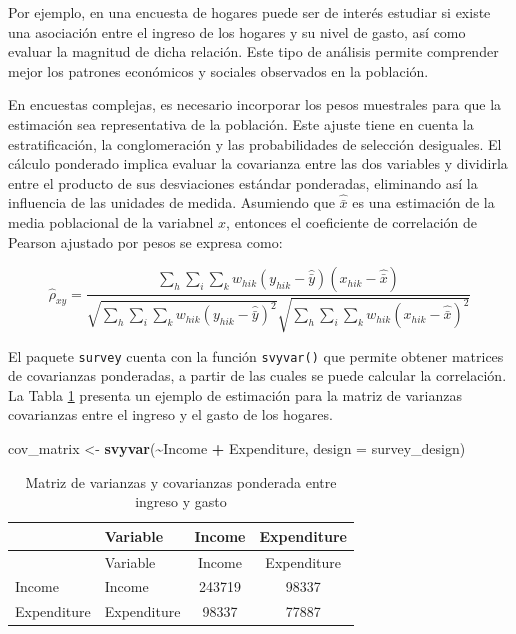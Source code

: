 \documentclass[
  spanish,
  12pt,
]{book}
\newenvironment{Shaded}{\begin{snugshade}}{\end{snugshade}}
\newcommand{\AttributeTok}[1]{\textcolor[rgb]{0.13,0.29,0.53}{#1}}
\newcommand{\FunctionTok}[1]{\textcolor[rgb]{0.13,0.29,0.53}{\textbf{#1}}}
\newcommand{\NormalTok}[1]{#1}
\newcommand{\OtherTok}[1]{\textcolor[rgb]{0.56,0.35,0.01}{#1}}
\newcommand{\SpecialCharTok}[1]{\textcolor[rgb]{0.81,0.36,0.00}{\textbf{#1}}}
\begin{document}
Por ejemplo, en una encuesta de hogares puede ser de interés estudiar si existe una asociación entre el ingreso de los hogares y su nivel de gasto, así como evaluar la magnitud de dicha relación. Este tipo de análisis permite comprender mejor los patrones económicos y sociales observados en la población.

En encuestas complejas, es necesario incorporar los pesos muestrales para que la estimación sea representativa de la población. Este ajuste tiene en cuenta la estratificación, la conglomeración y las probabilidades de selección desiguales. El cálculo ponderado implica evaluar la covarianza entre las dos variables y dividirla entre el producto de sus desviaciones estándar ponderadas, eliminando así la influencia de las unidades de medida. Asumiendo que \(\hat{\bar{x}}\) es una estimación de la media poblacional de la variabnel \(x\), entonces el coeficiente de correlación de Pearson ajustado por pesos se expresa como:

\[
\hat{\rho}_{xy} = \frac{\displaystyle \sum_{h} \sum_{i} \sum_{k} w_{hik} (y_{hik} - \hat{\bar{y}})(x_{hik} - \hat{\bar{x}})} {\sqrt{\displaystyle \sum_{h} \sum_{i} \sum_{k} w_{hik} (y_{hik} - \hat{\bar{y}})^2} \sqrt{\displaystyle \sum_{h} \sum_{i} \sum_{k} w_{hik} (x_{hik} - \hat{\bar{x}})^2}}
\]

El paquete \texttt{survey} cuenta con la función \texttt{svyvar()} que permite obtener matrices de covarianzas ponderadas, a partir de las cuales se puede calcular la correlación. La Tabla \ref{tab:tab-covarianza} presenta un ejemplo de estimación para la matriz de varianzas covarianzas entre el ingreso y el gasto de los hogares.

\begin{Shaded}
\begin{Highlighting}[]
\NormalTok{cov\_matrix }\OtherTok{\textless{}{-}} \FunctionTok{svyvar}\NormalTok{(}\SpecialCharTok{\textasciitilde{}}\NormalTok{Income }\SpecialCharTok{+}\NormalTok{ Expenditure, }\AttributeTok{design =}\NormalTok{ survey\_design)}
\end{Highlighting}
\end{Shaded}

\begin{longtable}[]{@{}llcc@{}}
\caption{\label{tab:tab-covarianza}Matriz de varianzas y covarianzas ponderada entre ingreso y gasto}\tabularnewline
\toprule\noalign{}
& Variable & Income & Expenditure \\
\midrule\noalign{}
\endfirsthead
\toprule\noalign{}
& Variable & Income & Expenditure \\
\midrule\noalign{}
\endhead
\bottomrule\noalign{}
\endlastfoot
Income & Income & 243719 & 98337 \\
Expenditure & Expenditure & 98337 & 77887 \\
\end{longtable}
\end{document}
